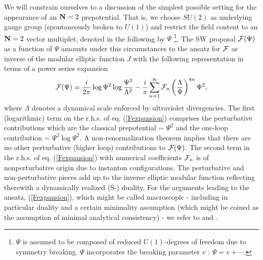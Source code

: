 \documentclass[a4paper,12pt]{article}
\begin{document}
We will constrain ourselves to a discussion of the simplest 
possible setting for the appearance of an ${\bf N}=2$ prepotential. 
That is, we choose $SU(2)$ as underlying gauge group (spontaneously 
broken to $U(1)$) and restrict the field content to an ${\bf N}=2$ 
vector multiplet, denoted in the following by $\Psi$ \footnote{$\Psi$ 
is assumed to be composed of 
reduced $U(1)$-degrees of freedom due to symmetry breaking. $\Psi$ 
incorporates the breaking parameter $v$ : $\Psi=v+ \cdots$.}. 
The SW proposal  ${\cal F}(\Psi)$ as a function of $\Psi$ amounts under this 
circumstances to the ansatz for ${\cal F}$ as inverse of the  modular 
elliptic function $J$ \cite{erdelyi} with the following representation 
in terms of a power series expansion
\begin{equation}
{\cal F}(\Psi)=\frac{i}{2\pi} \log \Psi^2\log \frac{\Psi^2}{\Lambda^2} 
-\frac{i}{\pi}\sum_{n=1}^{\infty}{\cal F}_n \left(\frac{\Lambda}{\Psi}
\right)^{4n} \Psi^2, 
\label{Fexpansion}
\end{equation}   
where $\Lambda$ denotes a dynamical scale enforced by ultraviolet 
divergencies. The first (logarithmic) term on the r.h.s. of eq. 
(\ref{Fexpansion}) comprises the perturbative contributions which 
are the classical prepotential $\sim$ $\Psi^2$ and the one-loop 
contribution $\sim$  $\Psi^2 \log \Psi^2$. A non-renormalization 
theorem \cite{s2} implies that there are no other perturbative 
(higher loop) contributions to ${\cal F}(\Psi)$. 
The second term in the r.h.s. of eq. (\ref{Fexpansion}) with 
numerical coefficients ${\cal F}_n$ is of nonperturbative origin 
due to instanton configurations. The perturbative and non-perturbative 
pieces add up to the inverse elliptic modular function reflecting 
therewith a dynamically realized (S-) duality. For the arguments 
leading to the ansatz, (\ref{Fexpansion}), which might be called 
macroscopic - including in particular duality and a certain 
minimality assumption (which might be coined as the assumption of minimal 
analytical consistency) \cite{flume} - 
we refer to \cite{sw1} and \cite{sw2}. 
\end{document}
